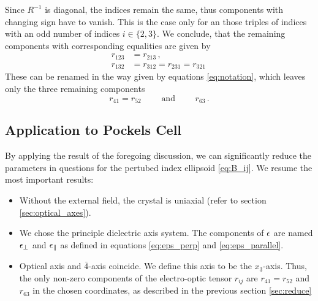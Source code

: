 Since $R^{-1}$ is diagonal, the indices remain the same, thus 
components with changing sign have to vanish. This is the case 
only for an those triples of indices with an 
odd number of indices $i \in \{2, 3\}$. We conclude, that 
the remaining components with corresponding equalities are given by
\begin{align*}
    r_{123} &=  r_{213}\, , \\
    r_{132} &=  r_{312} = r_{231} = r_{321}\,
\end{align*}
These can be renamed in the way given by equations \eqref{eq:notation}, 
which leaves only the three remaining components
\begin{equation}
    r_{41} = r_{52} \qquad \text{ and } \qquad  r_{63}\, .
\end{equation}

\subsection{Application to Pockels Cell}
By applying the result of the foregoing discussion, we can significantly 
reduce the parameters in questions for the pertubed index ellipsoid
\eqref{eq:B_ij}. We resume the most important results:
\begin{itemize}
    \item
    Without the external field, the crystal is uniaxial 
    (refer to section \ref{sec:optical_axes}).
    \item
    We chose the principle dielectric axis system. The 
    components of $\epsilon$ are named $\epsilon_\perp$ and 
    $\epsilon_\parallel$ as defined in equations 
    \eqref{eq:eps_perp} and \eqref{eq:eps_parallel}.  
    \item
    Optical axis and $\bar{4}$-axis coincide. We define 
    this axis to be the $x_3$-axis. Thus, the 
    only non-zero components of the electro-optic tensor 
    $r_{ij}$ are $r_{41} = r_{52}$ and $r_{63}$ in the 
    chosen coordinates, as described in the previous section 
    \ref{sec:reduce}
\end{itemize}


